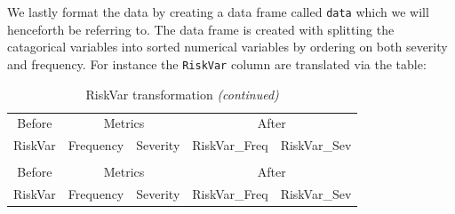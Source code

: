 \documentclass[
]{article}
\begin{document}
We lastly format the data by creating a data frame called \texttt{data}
which we will henceforth be referring to. The data frame is created with
splitting the catagorical variables into sorted numerical variables by
ordering on both severity and frequency. For instance the
\texttt{RiskVar} column are translated via the table:

\begin{longtable}[t]{lllll}
\caption{\label{tab:unnamed-chunk-10}RiskVar transformation}\\
\toprule
\multicolumn{1}{c}{Before} & \multicolumn{2}{c}{Metrics} & \multicolumn{2}{c}{After} \\
\cmidrule(l{3pt}r{3pt}){1-1} \cmidrule(l{3pt}r{3pt}){2-3} \cmidrule(l{3pt}r{3pt}){4-5}
RiskVar & Frequency & Severity & RiskVar\_Freq & RiskVar\_Sev\\
\midrule
\endfirsthead
\caption[]{RiskVar transformation \textit{(continued)}}\\
\toprule
\multicolumn{1}{c}{Before} & \multicolumn{2}{c}{Metrics} & \multicolumn{2}{c}{After} \\
\cmidrule(l{3pt}r{3pt}){1-1} \cmidrule(l{3pt}r{3pt}){2-3} \cmidrule(l{3pt}r{3pt}){4-5}
RiskVar & Frequency & Severity & RiskVar\_Freq & RiskVar\_Sev\\
\midrule
\endhead


\end{longtable}
\end{document}
